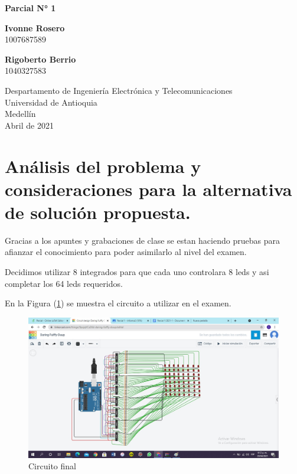 \documentclass{article}
\begin{document}
\begin{titlepage}
    \begin{center}
        \vspace*{1cm}
            
        \Huge
        \textbf{Parcial N° 1}
            
        \vspace{2 cm}
        \LARGE
    
            
        \vspace{2 cm}
            
        \textbf{Ivonne  Rosero }\\
        \large
        1007687589
        
        \vspace{2cm}
        \LARGE
        
        \textbf{Rigoberto Berrio}\\
        \large
        1040327583
            
        \vfill
            
        \vspace{0.8cm}
            
        \Large
        Despartamento de Ingeniería Electrónica y Telecomunicaciones\\
        Universidad de Antioquia\\
        Medellín\\
        Abril de 2021
            
    \end{center}
\end{titlepage}

\tableofcontents
\newpage
\section{Análisis del problema y consideraciones para la alternativa de solución propuesta.}\label{intro}
 
Gracias a los apuntes y grabaciones de clase se estan haciendo pruebas para afianzar el conocimiento para poder asimilarlo  al nivel del examen.

Decidimos utilizar 8 integrados para que cada uno controlara 8 leds y asi completar los 64 leds requeridos.

En la Figura (\ref{fig:circuito}) se muestra el circuito a utilizar en el examen.
\begin{figure}[h]
\includegraphics[width=12cm]{circuito.jpg}
\centering
\caption{Circuito final}
\label{fig:circuito}
\end{figure}
\end{document}
